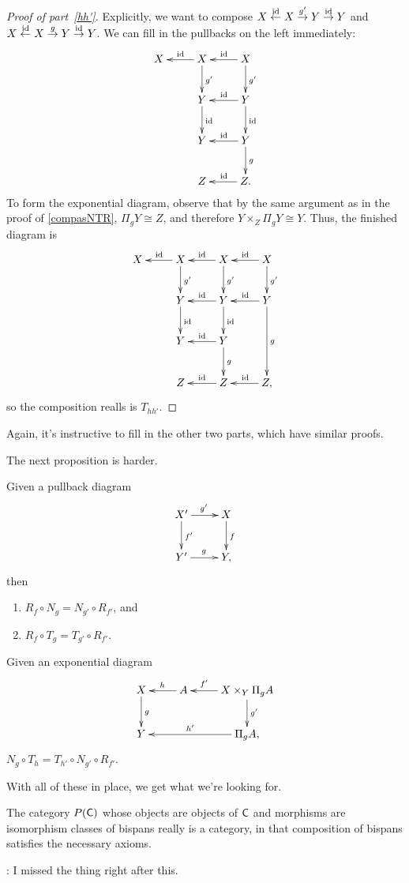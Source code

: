\begin{proof}[Proof of part~\eqref{hh'}]
Explicitly, we want to compose $X\stackrel{\mathrm{id}}\gets X\stackrel{g'}\to Y\stackrel{\mathrm{id}}\to Y$ and $X\stackrel{\mathrm{id}}\gets
X\stackrel{g}\to Y\stackrel{\mathrm{id}}\to Y$. We can fill in the pullbacks on the left immediately:
\[\xymatrix{
	X & X\ar[l]_\id\ar[d]^{g'} & X\ar[l]_\id\ar[d]^{g'}\\
	& Y\ar[d]^\id & Y\ar[l]_\id\ar[d]^\id\\
	& Y & Y\ar[l]_\id\ar[d]^g\\
	& Z & Z.\ar[l]_\id
}\]
To form the exponential diagram, observe that by the same argument as in the proof of \cref{compasNTR}, $\Pi_g
Y\cong Z$, and therefore $Y\times_Z\Pi_g Y\cong Y$. Thus, the finished diagram is
\[\xymatrix{
	X & X\ar[l]_\id\ar[d]^{g'} & X\ar[l]_\id\ar[d]^{g'} & X\ar[l]_\id\ar[d]^{g'}\\
	& Y\ar[d]^\id & Y\ar[l]_\id\ar[d]^\id & Y\ar[l]_\id\ar[dd]^g\\
	& Y & Y\ar[l]_\id\ar[d]^g\\
	& Z & Z\ar[l]_\id & Z\ar[l]_\id,
}\]
so the composition realls is $T_{hh'}$.
\end{proof}
Again, it's instructive to fill in the other two parts, which have similar proofs.

The next proposition is harder.
\begin{prop}
Given a pullback diagram
\[\xymatrix{
	X'\ar[r]^{g'}\ar[d]^{f'} & X\ar[d]^f\\
	Y'\ar[r]^g & Y,
}\]
then
\begin{enumerate}
	\item $R_f\circ N_g = N_{g'}\circ R_{f'}$, and
	\item $R_f\circ T_g = T_{g'}\circ R_{f'}$.
\end{enumerate}
\end{prop}
\begin{prop}
Given an exponential diagram
\[\xymatrix{
	X\ar[d]^g & A\ar[l]_h & X\times_Y \Pi_g A\ar[l]_-{f'}\ar[d]^{g'}\\
	Y && \Pi_g A,\ar[ll]_-{h'}
}\]
$N_g\circ T_h = T_{h'}\circ N_{g'}\circ R_{f'}$.
\end{prop}
With all of these in place, we get what we're looking for.
\begin{cor}
The category $P(\mathsf C)$ whose objects are objects of $\mathsf C$ and morphisms are isomorphism classes of bispans really is
a category, in that composition of bispans satisfies the necessary axioms.
\end{cor}
\TODO: I missed the thing right after this.

